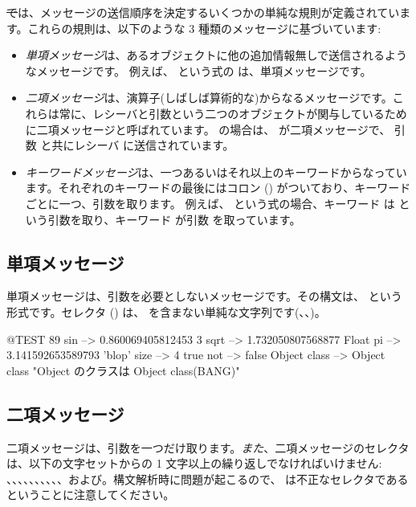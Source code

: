 \documentclass[a4paper,10pt,twoside]{book}
\begin{document}
\st では、メッセージの送信順序を決定するいくつかの単純な規則が定義されています。これらの規則は、以下のような 3 種類のメッセージに基づいています:
\begin{itemize}
\item \emph{単項メッセージ}は、あるオブジェクトに他の追加情報無しで送信されるようなメッセージです。 例えば、 という式の  は、単項メッセージです。
\item  \emph{二項メッセージ}は、演算子(しばしば算術的な)からなるメッセージです。これらは常に、レシーバと引数という二つのオブジェクトが関与しているために二項メッセージと呼ばれています。 の場合は、\ct{+} が二項メッセージで、 引数  と共にレシーバ  に送信されています。
\item  \emph{キーワードメッセージ}は、一つあるいはそれ以上のキーワードからなっています。それぞれのキーワードの最後にはコロン (\ct{:}) がついており、キーワードごとに一つ、引数を取ります。
例えば、 という式の場合、キーワード  は  という引数を取り、キーワード  が引数  を取っています。
\end{itemize}

\subsection{単項メッセージ}
単項メッセージは、引数を必要としないメッセージです。その構文は、 という形式です。セレクタ () は、\ct{:} を含まない単純な文字列です(\eg {}、、)。
\begin{code}{@TEST}
89 sin           --> 0.860069405812453
3 sqrt           --> 1.732050807568877
Float pi         --> 3.141592653589793
'blop' size     --> 4
true not        --> false
Object class --> Object class  "Object のクラスは Object class(BANG)"
\end{code}


\subsection{二項メッセージ} 
二項メッセージは、引数を一つだけ取ります。\emph{また}、二項メッセージのセレクタは、以下の文字セットからの 1 文字以上の繰り返しでなければいけません: \ct{+}、\ct{-}、\ct{*}、\ct{/}、\ct{\&}、\ct{=}、\ct{>}、\ct{|}、\ct{<}、\ct{\~}、および。構文解析時に問題が起こるので、\ct{--} は不正なセレクタであるということに注意してください。
\end{document}

